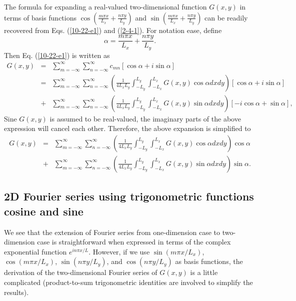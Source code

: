 \documentclass{article}
\begin{document}
The formula for expanding a real-valued two-dimensional function $G (x, y)$ in
terms of basis functions $\cos \left( \frac{m \pi x}{L_x} + \frac{n \pi
y}{L_y} \right)$ and $\sin \left( \frac{m \pi x}{L_x} + \frac{n \pi y}{L_y}
\right)$ can be readily recovered from Eqs. (\ref{10-22-e1}) and
(\ref{2-4-1}). For notation ease, define
\begin{equation}
  \alpha = \frac{m \pi x}{L_x} + \frac{n \pi y}{L_y} .
\end{equation}
Then Eq. (\ref{10-22-e1}) is written as
\begin{eqnarray*}
  G (x, y) & = & \sum_{m = - \infty}^{\infty} \sum_{n = - \infty}^{\infty}
  c_{m n} [\cos \alpha + i \sin \alpha]\\
  & = & \sum_{m = - \infty}^{\infty} \sum_{n = - \infty}^{\infty} \left(
  \frac{1}{4 L_x L_y} \int_{- L_y}^{L_y} \int_{- L_x}^{L_x} G (x, y) \cos
  \alpha d x d y \right)  [\cos \alpha + i \sin \alpha]\\
  & + & \sum_{m = - \infty}^{\infty} \sum_{n = - \infty}^{\infty} \left(
  \frac{1}{4 L_x L_y} \int_{- L_y}^{L_y} \int_{- L_x}^{L_x} G (x, y) \sin
  \alpha d x d y \right) [- i \cos \alpha + \sin \alpha],
\end{eqnarray*}
Sine $G (x, y)$ is assumed to be real-valued, the imaginary parts of the above
expression will cancel each other. Therefore, the above expansion is
simplified to
\begin{eqnarray}
  G (x, y) & = & \sum_{m = - \infty}^{\infty} \sum_{n = - \infty}^{\infty}
  \left( \frac{1}{4 L_x L_y} \int_{- L_y}^{L_y} \int_{- L_x}^{L_x} G (x, y)
  \cos \alpha d x d y \right) \cos \alpha \nonumber\\
  & + & \sum_{m = - \infty}^{\infty} \sum_{n = - \infty}^{\infty} \left(
  \frac{1}{4 L_x L_y} \int_{- L_y}^{L_y} \int_{- L_x}^{L_x} G (x, y) \sin
  \alpha d x d y \right) \sin \alpha .  \label{23-3-31-p1}
\end{eqnarray}


\subsection{2D Fourier series using trigonometric functions cosine and
sine}\label{10-23-8}

We see that the extension of Fourier series from one-dimension case to
two-dimension case is straightforward when expressed in terms of the complex
exponential function $e^{i n \pi x / L}$. However, if we use $\sin (m \pi x /
L_x)$, $\cos (m \pi x / L_x)$, $\sin (n \pi y / L_y)$, and $\cos (n \pi y /
L_y)$ as basis functions, the derivation of the two-dimensional Fourier series
of $G (x, y)$ is a little complicated (product-to-sum trigonometric identities
are involved to simplify the results).
\end{document}
